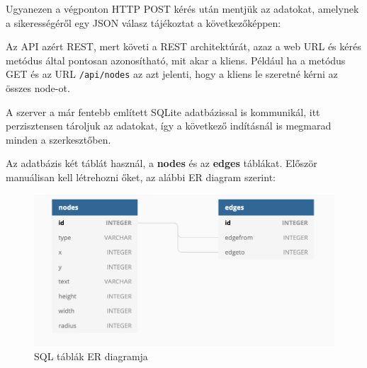 
Ugyanezen a végponton HTTP POST kérés után mentjük az adatokat, amelynek a sikerességéről egy JSON válasz tájékoztat a következőképpen:

\begin{json}
\end{json}


Az API azért REST, mert követi a REST architektúrát, azaz a web URL és kérés metódus által pontosan azonosítható, mit akar a kliens. Például ha a metódus GET és az URL \texttt{/api/nodes} az azt jelenti, hogy a kliens le szeretné kérni az összes node-ot.
 
A szerver a már fentebb említett SQLite adatbázissal is kommunikál, itt perzisztensen tároljuk az adatokat, így a következő indításnál is megmarad minden a szerkesztőben.

Az adatbázis két táblát használ, a \textbf{nodes} és az \textbf{edges} táblákat. Először manuálisan kell létrehozni őket, az alábbi ER diagram szerint:

\begin{figure}[h]
\centering
\includegraphics[scale=0.65]{images/sqltables.png}
\caption{SQL táblák ER diagramja}
\label{fig:sql}
\end{figure}


